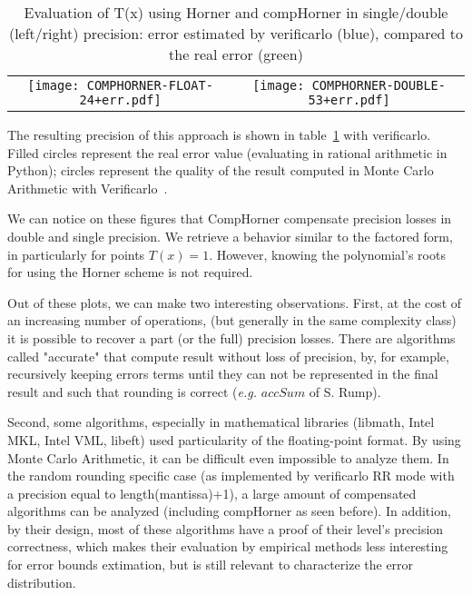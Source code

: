 \begin{table}
\begin{tabular}{cc}
\texttt{[image: COMPHORNER-FLOAT-24+err.pdf]}& 
\texttt{[image: COMPHORNER-DOUBLE-53+err.pdf]}\\
\end{tabular}
  \caption{Evaluation of T(x) using Horner and compHorner in single/double (left/right) precision: error estimated by verificarlo (blue), compared to the real error (green)}
  \label{fig:comphornerVerificarlo24_53}
\end{table}


The resulting precision of this approach is shown in table~\ref{fig:comphornerVerificarlo24_53} with verificarlo.
Filled circles represent the real error value (evaluating in rational arithmetic in Python); circles represent the quality of the result computed in Monte Carlo Arithmetic with Verificarlo~\cite{verrou}.

We can notice on these figures that CompHorner compensate precision losses in double and single precision. We retrieve a behavior similar to the factored form, in particularly for points $T(x)=1$. However, knowing the polynomial's roots for using the Horner scheme is not required.

Out of these plots, we can make two interesting observations.
First, at the cost of an increasing number of operations, (but generally in the same complexity class) it is possible to recover a part (or the full) precision losses. There are algorithms called "accurate" that compute result without loss of precision, by, for example, recursively keeping errors terms until they can not be represented in the final result and such that rounding is correct ({\it e.g.} $accSum$ of S. Rump).

Second, some algorithms, especially in mathematical libraries (libmath, Intel MKL, Intel VML, libeft) used particularity of the floating-point format. By using Monte Carlo Arithmetic, it can be difficult even impossible to analyze them. In the random rounding specific case (as implemented by verificarlo RR mode with a precision equal to length(mantissa)+1), a large amount of compensated algorithms can be analyzed (including compHorner as seen before). In addition, by their design, most of these algorithms have a proof of their level's precision correctness, which makes their evaluation by empirical methods less interesting for error bounds extimation, but is still relevant to characterize the error distribution.
